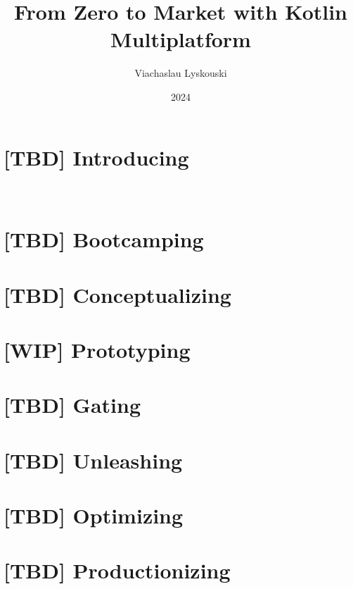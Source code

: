 \documentclass[12pt, a4paper, twoside]{extreport}
\author{Viachaslau Lyskouski}
\title{From Zero to Market with Kotlin Multiplatform}
\date{2024}
\begin{document}

\maketitle



\tableofcontents

\newpage
\section*{[TBD] Introducing}
~ %

\newpage
\section{[TBD] Bootcamping}




\newpage
\section{[TBD] Conceptualizing}


\newpage
\section{[WIP] Prototyping}



\newpage
\section{[TBD] Gating}


\newpage
\section{[TBD] Unleashing}


\newpage
\section{[TBD] Optimizing}


\newpage
\section{[TBD] Productionizing}

\end{document}
